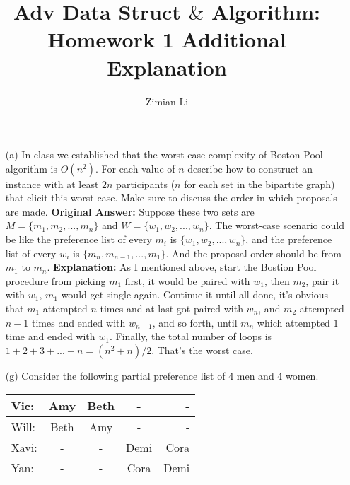 \documentclass{article}       %
\title{Adv Data Struct $\&$ Algorithm: Homework 1 Additional Explanation}
\author{Zimian Li}
\begin{document}
        
\maketitle
        \begin{enumerate}
                \item[(a)] In class we established that the worst-case complexity of Boston Pool algorithm is $O(n^2)$. For each value of $n$ describe how to construct an instance with at least $2n$ participants ($n$ for each set in the bipartite graph) that elicit this worst case. Make sure to discuss the order in which proposals are made.\newline\newline
                \textbf{Original Answer:}\newline
                Suppose these two sets are $M = \{m_1, m_2, ..., m_n\}$ and $W = \{w_1, w_2, ..., w_n\}$.\newline
                The worst-case scenario could be like the preference list of every $m_i$ is $\{w_1, w_2, ..., w_n\}$, and the preference list of every $w_i$ is $\{m_n, m_{n-1}, ..., m_1\}$. And the proposal order should be from $m_1$ to $m_n$.\newline\newline
                \textbf{Explanation:}\newline
                As I mentioned above, start the Bostion Pool procedure from picking $m_1$ first, it would be paired with $w_1$, then $m_2$, pair it with $w_1$, $m_1$ would get single again. Continue it until all done, it's obvious that $m_1$ attempted $n$ times and at last got paired with $w_n$, and $m_2$ attempted $n-1$ times and ended with $w_{n-1}$, and so forth, until $m_n$ which attempted $1$ time and ended with $w_1$. Finally, the total number of loops is $1+2+3+...+n = (n^2+n)/2$. That's the worst case.\newline
                \item[(g)]  Consider the following partial preference list of 4 men and 4 women. \newline
                 \begin{tabular}{ | l | c | c | c | r | }
                	\hline
                	Vic: & Amy & Beth & - & -\\ \hline
                	Will: & Beth & Amy & - & - \\ \hline
                	Xavi: & - & - & Demi & Cora \\ \hline
                	Yan: & - & - & Cora & Demi \\ \hline

\end{tabular}
\end{enumerate}
\end{document}
